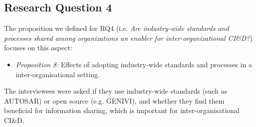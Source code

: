 
\subsection{Research Question 4}\label{sec:ResearchQuestion4}

The proposition we defined for  
RQ4 (i.e. {\em Are industry-wide standards and processes shared among organizations an enabler{ for inter-organizational CI\&D}?}) focuses on this aspect: %

\begin{itemize}
\item \emph{Proposition 8: }{ Effects of adopting industry-wide standards and processes in a inter-organisational setting}.%
\end{itemize}



The interviewees were asked if they use industry-wide standards (such as AUTOSAR) or open source (e.g. GENIVI), and whether they find them beneficial for information sharing, which is important for inter-organisational CI\&D. 

